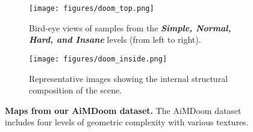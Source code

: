 


\begin{figure}[t]
    \centering
    \begin{subfigure}{\textwidth}
        \centering
        \texttt{[image: figures/doom\_top.png]}
        \vspace{-1.5em}
        \caption{Bird-eye views of samples from the \textbf{\textit{Simple, Normal, Hard, and Insane}} levels (from left to right).}
        \label{fig:dataset_top}
    \end{subfigure}

    \begin{subfigure}{\textwidth}
        \centering
        \texttt{[image: figures/doom\_inside.png]}
        \caption{Representative images showing the internal structural composition of the scene.}
        \label{fig:dataset_inside}
    \end{subfigure}
    \caption{\textbf{Maps from our AiMDoom dataset.} The AiMDoom dataset includes four levels of geometric complexity with various textures.}
    \label{fig:dataset}
    \vspace{-1em}
\end{figure}